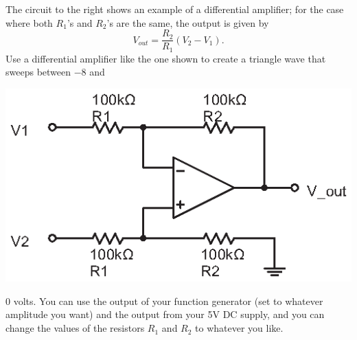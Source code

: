 \begin{enumerate}[wide]
\begin{minipage}{.53\textwidth}
\item The circuit to the right shows an example of a differential amplifier; for the case where both $R_1$'s and $R_2$'s are the same, the output is given by  \label{part_differential}
\begin{equation*}
V_{out} = \frac{R_2}{R_1} \left( V_2 - V_1 \right).
\end{equation*}
Use a differential amplifier like the one shown to create a triangle wave that sweeps between $-8$ and
\end{minipage}
\begin{minipage}{.46\textwidth}
\begin{flushright}
\includegraphics{op-amps/differential_amp.eps}

\vspace*{0.2in}
\end{flushright}
\end{minipage}
0 volts.  You can use the output of your function generator (set to whatever amplitude you want) and the output from your 5V DC supply, and you can change the values of the resistors $R_1$ and $R_2$ to whatever you like.  


\end{enumerate}

